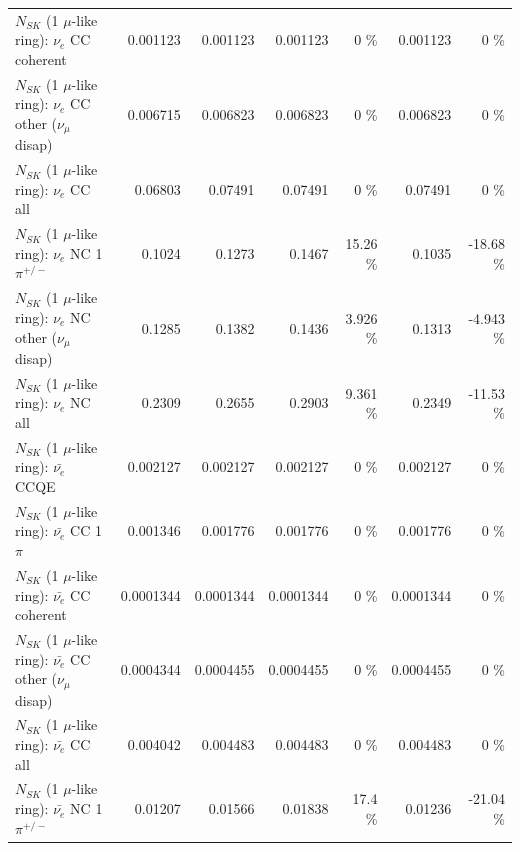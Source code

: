 \begin{table}
\begin{tabular}{| l | r | r | r  r | r  r |}
                               $N_{SK}$ (1 $\mu$-like ring): $\nu_e$ CC coherent &        0.001123 &        0.001123 &        0.001123 &        0 \%  &        0.001123 &        0 \%  \\ 
                $N_{SK}$ (1 $\mu$-like ring): $\nu_e$ CC other ($\nu_\mu$ disap) &        0.006715 &        0.006823 &        0.006823 &        0 \%  &        0.006823 &        0 \%  \\ 
                                  $N_{SK}$ (1 $\mu$-like ring): $\nu_{e}$ CC all &         0.06803 &         0.07491 &         0.07491 &        0 \%  &         0.07491 &        0 \%  \\ 
\hline
                           $N_{SK}$ (1 $\mu$-like ring): $\nu_e$ NC 1$\pi^{+/-}$ &          0.1024 &          0.1273 &          0.1467 &    15.26 \%  &          0.1035 &   -18.68 \%  \\ 
                $N_{SK}$ (1 $\mu$-like ring): $\nu_e$ NC other ($\nu_\mu$ disap) &          0.1285 &          0.1382 &          0.1436 &    3.926 \%  &          0.1313 &   -4.943 \%  \\ 
                                  $N_{SK}$ (1 $\mu$-like ring): $\nu_{e}$ NC all &          0.2309 &          0.2655 &          0.2903 &    9.361 \%  &          0.2349 &   -11.53 \%  \\ 
\hline
\hline
\hline
                                $N_{SK}$ (1 $\mu$-like ring): $\bar{\nu_e}$ CCQE &        0.002127 &        0.002127 &        0.002127 &        0 \%  &        0.002127 &        0 \%  \\ 
                           $N_{SK}$ (1 $\mu$-like ring): $\bar{\nu_e}$ CC 1$\pi$ &        0.001346 &        0.001776 &        0.001776 &        0 \%  &        0.001776 &        0 \%  \\ 
                         $N_{SK}$ (1 $\mu$-like ring): $\bar{\nu_e}$ CC coherent &       0.0001344 &       0.0001344 &       0.0001344 &        0 \%  &       0.0001344 &        0 \%  \\ 
          $N_{SK}$ (1 $\mu$-like ring): $\bar{\nu_e}$ CC other ($\nu_\mu$ disap) &       0.0004344 &       0.0004455 &       0.0004455 &        0 \%  &       0.0004455 &        0 \%  \\ 
                            $N_{SK}$ (1 $\mu$-like ring): $\bar{\nu_{e}}$ CC all &        0.004042 &        0.004483 &        0.004483 &        0 \%  &        0.004483 &        0 \%  \\ 
\hline
                     $N_{SK}$ (1 $\mu$-like ring): $\bar{\nu_e}$ NC 1$\pi^{+/-}$ &         0.01207 &         0.01566 &         0.01838 &     17.4 \%  &         0.01236 &   -21.04 \%  \\ 

\end{tabular}
\end{table}
